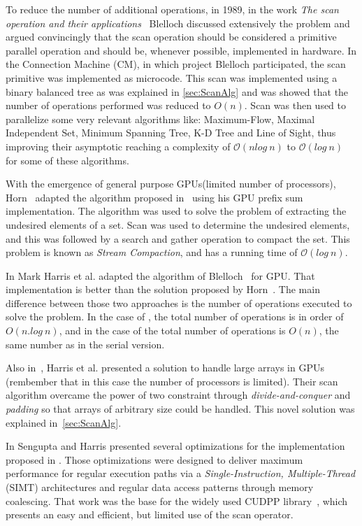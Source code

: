 \documentclass[Ingles]{ic-tese-v1}
\newcommand{\tit}[1]{{\textit{#1}}}
\begin{document}
To reduce the number of additional operations, in 1989, in the work \textit{The scan operation and their applications}~\cite{ScanAsPrimitive} Blelloch discussed extensively the problem and argued convincingly that the scan operation should be considered a primitive parallel operation and should be, whenever 	possible, implemented in hardware. In the Connection Machine (CM), in which project  Blelloch participated, the scan primitive was implemented as microcode. This scan was  implemented using a binary balanced tree as was explained in  \ref{sec:ScanAlg} and was showed that the number of operations performed was reduced to $O(n)$.  Scan was  then used  to parallelize   some  very  relevant   algorithms  like: Maximum-Flow, Maximal Independent Set, Minimum Spanning Tree, K-D Tree and Line  of Sight, thus improving their asymptotic reaching a complexity of $\mathcal{O}(n log\ n)$ to $\mathcal{O}(log\ n)$ for some of these algorithms.

With the emergence of general purpose GPUs(limited number of processors), Horn~\cite{GPUGems2} adapted the algorithm proposed in~\cite{dataparallel} using his GPU prefix sum implementation. The algorithm was used  to solve the problem of extracting the undesired elements of a set. Scan  was used to determine  the undesired elements, and this was followed by a search and  gather   operation  to   compact the set.  This   problem  is   known  as \textit{Stream   Compaction},  and has a running  time   of $\mathcal{O}(log\ n)$.

In \cite{harris2007parallel} Mark Harris  et al. adapted the algorithm of Blelloch~\cite{ScanAsPrimitive} for GPU. That  implementation is better than
the solution  proposed by Horn~\cite{GPUGems2}. The  main difference between those two approaches is the number of operations executed to
solve the problem. In the case of \cite{GPUGems2}, the total number of operations is in order of $O(n.log\ n)$, and in the case of \cite{harris2007parallel}
the  total number  of operations  is $O(n)$,  the same  number as  in the serial version.

Also in~\cite{harris2007parallel}, Harris et al. presented a solution  to handle large arrays in GPUs (rembember that in this case the
number of processors is limited). Their scan algorithm overcame the power of two constraint through \tit{divide-and-conquer} and \tit{padding}
so that arrays of arbitrary size could be handled. This novel solution was explained in~\ref{sec:ScanAlg}.

In   \cite{Sengupta:2008}  Sengupta and  Harris presented  several
optimizations     for      the     implementation      proposed     in
\cite{harris2007parallel}. Those  optimizations   were  designed  to
deliver  maximum  performance  for regular  execution  paths  via  a
\textit{Single-Instruction,  Multiple-Thread} (SIMT) architectures and
regular data access patterns through memory coalescing.  That work was
the  base  for  the  widely  used  CUDPP  library~\cite{CUDPP},  which
presents an easy and efficient, but limited use of the scan operator.
\end{document}
